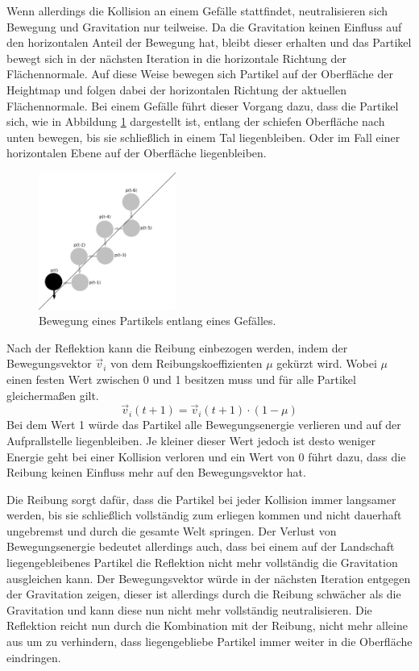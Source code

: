 \begin{Spacing}{\mylinespace}
		Wenn allerdings die Kollision an einem Gefälle stattfindet, neutralisieren
		sich Bewegung und Gravitation nur teilweise. Da die Gravitation keinen
		Einfluss auf den horizontalen Anteil der Bewegung hat, bleibt dieser
		erhalten und das Partikel bewegt sich in der nächsten Iteration in die
		horizontale Richtung der Flächennormale.
		Auf diese Weise bewegen sich Partikel auf der Oberfläche der Heightmap
		und folgen dabei der horizontalen Richtung der aktuellen Flächennormale.
		Bei einem Gefälle führt dieser Vorgang dazu, dass die Partikel sich,
		wie in Abbildung \ref{fig:rolling} dargestellt ist,
		entlang der schiefen Oberfläche nach unten bewegen, bis sie schließlich
		in einem Tal liegenbleiben. Oder im Fall einer horizontalen Ebene auf der Oberfläche liegenbleiben.
		\begin{figure}[h!]
			\centering
			\vspace*{30px}
			\includegraphics[width=0.4\textwidth]{graphics/Phys_rolling.png}
			\caption{Bewegung eines Partikels entlang eines Gefälles.}
			\label{fig:rolling}
		\end{figure}

		
		Nach der Reflektion kann die Reibung einbezogen werden, indem der Bewegungsvektor
		$\vec{v}_{i}$ von dem Reibungskoeffizienten $\mu$ gekürzt wird. Wobei $\mu$
		einen festen Wert zwischen 0 und 1 besitzen muss und für alle Partikel gleichermaßen gilt.
		\[ \vec{v}_{i}(t+1) = \vec{v}_{i}(t+1) \cdot ( 1 - \mu ) \]
		Bei dem Wert 1 würde das Partikel alle Bewegungsenergie verlieren und auf der
		Aufprallstelle liegenbleiben. Je kleiner dieser Wert jedoch ist desto weniger
		Energie geht bei einer Kollision verloren und ein Wert von 0 führt dazu, dass
		die Reibung keinen Einfluss mehr auf den Bewegungsvektor hat.

		Die Reibung sorgt dafür, dass die Partikel bei jeder Kollision immer langsamer
		werden, bis sie schließlich vollständig zum erliegen kommen und
		nicht dauerhaft ungebremst und durch die gesamte Welt springen.
		Der Verlust von Bewegungsenergie bedeutet allerdings auch, dass bei einem auf der
		Landschaft liegengebleibenes Partikel die Reflektion nicht mehr vollständig die
		Gravitation ausgleichen kann. Der Bewegungsvektor würde in der
		nächsten Iteration entgegen der Gravitation zeigen, dieser ist allerdings durch die Reibung
		schwächer als die Gravitation und kann diese nun nicht mehr vollständig neutralisieren. Die Reflektion
		reicht nun durch die Kombination mit der Reibung, nicht mehr alleine aus
		um zu verhindern, dass liegengebliebe Partikel immer weiter in die Oberfläche eindringen.


\end{Spacing}
